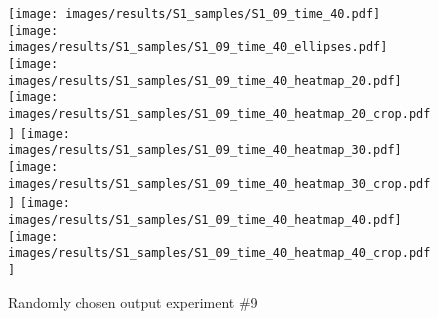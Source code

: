 \begin{figure*}[h]
\centering
\begin{minipage}[t]{\linewidth}
\texttt{[image: images/results/S1\_samples/S1\_09\_time\_40.pdf]}
\texttt{[image: images/results/S1\_samples/S1\_09\_time\_40\_ellipses.pdf]}
\texttt{[image: images/results/S1\_samples/S1\_09\_time\_40\_heatmap\_20.pdf]}
\texttt{[image: images/results/S1\_samples/S1\_09\_time\_40\_heatmap\_20\_crop.pdf]}
\texttt{[image: images/results/S1\_samples/S1\_09\_time\_40\_heatmap\_30.pdf]}
\texttt{[image: images/results/S1\_samples/S1\_09\_time\_40\_heatmap\_30\_crop.pdf]}
\texttt{[image: images/results/S1\_samples/S1\_09\_time\_40\_heatmap\_40.pdf]}
\texttt{[image: images/results/S1\_samples/S1\_09\_time\_40\_heatmap\_40\_crop.pdf]}
\end{minipage}
\caption{Randomly chosen output experiment \#9}\end{figure*}
\endgroup
